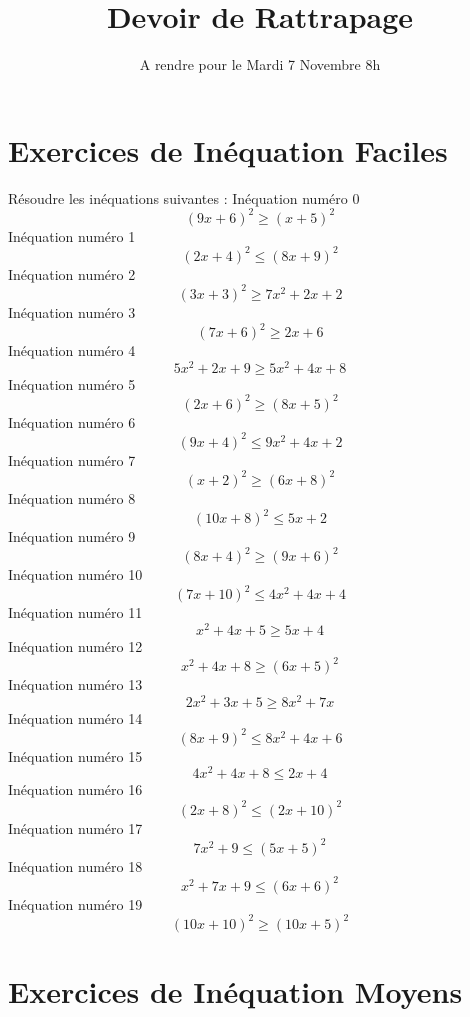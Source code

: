 \documentclass{article}
\title{Devoir de Rattrapage}
\date{A rendre pour le Mardi 7 Novembre 8h}\usepackage{natbib}
\begin{document}
\maketitle
 \section{Exercices de In\'equation Faciles}

 R\'esoudre les in\'equations suivantes : 
In\'equation num\'ero 0 \[\left(9 x + 6\right)^{2} \geq \left(x + 5\right)^{2}\]In\'equation num\'ero 1 \[\left(2 x + 4\right)^{2} \leq \left(8 x + 9\right)^{2}\]In\'equation num\'ero 2 \[\left(3 x + 3\right)^{2} \geq 7 x^{2} + 2 x + 2\]In\'equation num\'ero 3 \[\left(7 x + 6\right)^{2} \geq 2 x + 6\]In\'equation num\'ero 4 \[5 x^{2} + 2 x + 9 \geq 5 x^{2} + 4 x + 8\]In\'equation num\'ero 5 \[\left(2 x + 6\right)^{2} \geq \left(8 x + 5\right)^{2}\]In\'equation num\'ero 6 \[\left(9 x + 4\right)^{2} \leq 9 x^{2} + 4 x + 2\]In\'equation num\'ero 7 \[\left(x + 2\right)^{2} \geq \left(6 x + 8\right)^{2}\]In\'equation num\'ero 8 \[\left(10 x + 8\right)^{2} \leq 5 x + 2\]In\'equation num\'ero 9 \[\left(8 x + 4\right)^{2} \geq \left(9 x + 6\right)^{2}\]In\'equation num\'ero 10 \[\left(7 x + 10\right)^{2} \leq 4 x^{2} + 4 x + 4\]In\'equation num\'ero 11 \[x^{2} + 4 x + 5 \geq 5 x + 4\]In\'equation num\'ero 12 \[x^{2} + 4 x + 8 \geq \left(6 x + 5\right)^{2}\]In\'equation num\'ero 13 \[2 x^{2} + 3 x + 5 \geq 8 x^{2} + 7 x\]In\'equation num\'ero 14 \[\left(8 x + 9\right)^{2} \leq 8 x^{2} + 4 x + 6\]In\'equation num\'ero 15 \[4 x^{2} + 4 x + 8 \leq 2 x + 4\]In\'equation num\'ero 16 \[\left(2 x + 8\right)^{2} \leq \left(2 x + 10\right)^{2}\]In\'equation num\'ero 17 \[7 x^{2} + 9 \leq \left(5 x + 5\right)^{2}\]In\'equation num\'ero 18 \[x^{2} + 7 x + 9 \leq \left(6 x + 6\right)^{2}\]In\'equation num\'ero 19 \[\left(10 x + 10\right)^{2} \geq \left(10 x + 5\right)^{2}\]
 \section{Exercices de In\'equation Moyens}
\end{document}
